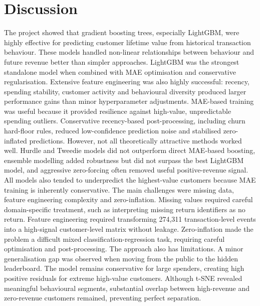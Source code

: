 \section{Discussion}
The project showed that gradient boosting trees, especially LightGBM, were highly effective for predicting customer lifetime value from historical transaction behaviour. These models handled non-linear relationships between behaviour and future revenue better than simpler approaches. LightGBM was the strongest standalone model when combined with MAE optimisation and conservative regularisation. Extensive feature engineering was also highly successful: recency, spending stability, customer activity and behavioural diversity produced larger performance gains than minor hyperparameter adjustments.
MAE-based training was useful because it provided resilience against high-value, unpredictable spending outliers. Conservative recency-based post-processing, including churn hard-floor rules, reduced low-confidence prediction noise and stabilised zero-inflated predictions. However, not all theoretically attractive methods worked well. Hurdle and Tweedie models did not outperform direct MAE-based boosting, ensemble modelling added robustness but did not surpass the best LightGBM model, and aggressive zero-forcing often removed useful positive-revenue signal. All models also tended to underpredict the highest-value customers because MAE training is inherently conservative.
The main challenges were missing data, feature engineering complexity and zero-inflation. Missing values required careful domain-specific treatment, such as interpreting missing return identifiers as no return. Feature engineering required transforming 274,311 transaction-level events into a high-signal customer-level matrix without leakage. Zero-inflation made the problem a difficult mixed classification-regression task, requiring careful optimisation and post-processing.
The approach also has limitations. A minor generalisation gap was observed when moving from the public to the hidden leaderboard. The model remains conservative for large spenders, creating high positive residuals for extreme high-value customers. Although t-SNE revealed meaningful behavioural segments, substantial overlap between high-revenue and zero-revenue customers remained, preventing perfect separation.
